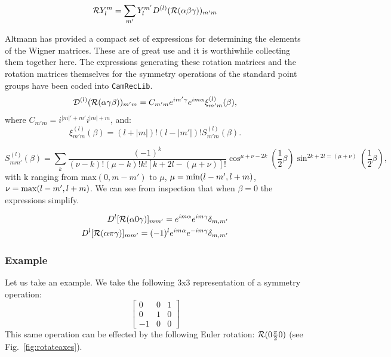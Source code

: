 \begin{equation}
{\mathcal{R}} Y_{l}^{m} = \sum_{m'} Y_{l}^{m'}D^{(l)}({\mathcal{R}}(\alpha\beta\gamma))_{m'm}
\end{equation}

Altmann\cite{altmann63a} has provided a compact set of expressions 
for determining the elements of the Wigner matrices. These are of 
great use and it is worthiwhile collecting them together here. The expressions
generating these rotation matrices and the rotation matrices themselves
for the symmetry operations of the standard point groups have been coded
into \texttt{CamRecLib}.
%
\begin{equation}
\mathcal{D}^{(l)}({\mathcal{R}}(\alpha\gamma\beta))_{m'm}= C_{m'm}e^{im'\gamma}e^{im\alpha}\xi^{(l)}_{m'm}(\beta),
\end{equation}
%
where $C_{m'm}=i^{|m|'+m'}i^{|m|+m}$, and:
%
\begin{equation}
\xi^{(l)}_{m'm}(\beta)= (l+|m|)!(l-|m'|)!S^(l)_{m'm}(\beta).
\end{equation}

\begin{equation}
S^{(l)}_{mm'}(\beta) = \sum_{k} \frac{(-1)^{k}}{(\nu-k)!(\mu-k)!k![k+2l-(\mu+\nu)]!} \cos^{\mu+\nu-2k}(\frac{1}{2}\beta) 
\sin^{2k+2l=(\mu+\nu)}(\frac{1}{2}\beta),
\end{equation}
%
with k ranging from max$(0,m-m')$ to $\mu$, $\mu={\rm min}(l-m',l+m)$, $\nu = {\rm max}(l-m',l+m)$. 
We can see from inspection that when $\beta=0$ the expressions simplify.

\begin{align}
D^{l}[{\mathcal{R}}(\alpha 0 \gamma)]_{mm'} = e^{im\alpha}e^{im\gamma}\delta_{m,m'} \\
D^{l}[{\mathcal{R}}(\alpha \pi \gamma)]_{mm'} = (-1)^{l}e^{im\alpha}e^{-im\gamma}\delta_{m,m'}
\end{align}

\subsubsection{Example}
Let us take an example. We take the following 3x3 
representation of a symmetry operation:
%
\begin{equation}
\left[\begin{array}{ccc}
0  & 0 &  1 \\
0  & 1 &  0 \\
-1 & 0 &  0 	
\end{array}\right]
\end{equation}
%
This same operation can be effected by 
the following Euler rotation: ${\mathcal{R}}(0\frac{\pi}{2}0)$ 
(see Fig.~\ref{fig:rotateaxes}).

